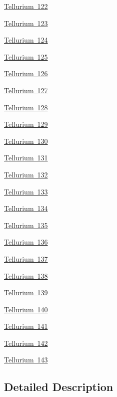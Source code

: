 \begin{DoxyCompactItemize}
\item 
\mbox{\hyperlink{group___isotope_const-_tellurium-_te122}{Tellurium 122}}
\item 
\mbox{\hyperlink{group___isotope_const-_tellurium-_te123}{Tellurium 123}}
\item 
\mbox{\hyperlink{group___isotope_const-_tellurium-_te124}{Tellurium 124}}
\item 
\mbox{\hyperlink{group___isotope_const-_tellurium-_te125}{Tellurium 125}}
\item 
\mbox{\hyperlink{group___isotope_const-_tellurium-_te126}{Tellurium 126}}
\item 
\mbox{\hyperlink{group___isotope_const-_tellurium-_te127}{Tellurium 127}}
\item 
\mbox{\hyperlink{group___isotope_const-_tellurium-_te128}{Tellurium 128}}
\item 
\mbox{\hyperlink{group___isotope_const-_tellurium-_te129}{Tellurium 129}}
\item 
\mbox{\hyperlink{group___isotope_const-_tellurium-_te130}{Tellurium 130}}
\item 
\mbox{\hyperlink{group___isotope_const-_tellurium-_te131}{Tellurium 131}}
\item 
\mbox{\hyperlink{group___isotope_const-_tellurium-_te132}{Tellurium 132}}
\item 
\mbox{\hyperlink{group___isotope_const-_tellurium-_te133}{Tellurium 133}}
\item 
\mbox{\hyperlink{group___isotope_const-_tellurium-_te134}{Tellurium 134}}
\item 
\mbox{\hyperlink{group___isotope_const-_tellurium-_te135}{Tellurium 135}}
\item 
\mbox{\hyperlink{group___isotope_const-_tellurium-_te136}{Tellurium 136}}
\item 
\mbox{\hyperlink{group___isotope_const-_tellurium-_te137}{Tellurium 137}}
\item 
\mbox{\hyperlink{group___isotope_const-_tellurium-_te138}{Tellurium 138}}
\item 
\mbox{\hyperlink{group___isotope_const-_tellurium-_te139}{Tellurium 139}}
\item 
\mbox{\hyperlink{group___isotope_const-_tellurium-_te140}{Tellurium 140}}
\item 
\mbox{\hyperlink{group___isotope_const-_tellurium-_te141}{Tellurium 141}}
\item 
\mbox{\hyperlink{group___isotope_const-_tellurium-_te142}{Tellurium 142}}
\item 
\mbox{\hyperlink{group___isotope_const-_tellurium-_te143}{Tellurium 143}}
\end{DoxyCompactItemize}


\subsection{Detailed Description}
